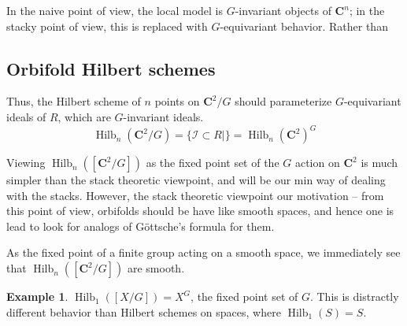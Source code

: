 \documentclass{amsart}[12pt]
\theoremstyle{definition}
\newtheorem{example}[dummy]{Example}
\newcommand{\C}{\mathbf{C}}
\DeclareMathOperator{\Hilb}{Hilb}
\begin{document}
In the naive point of view, the local model is $G$-invariant objects of $\C^n$; in the stacky point of view, this is replaced with $G$-equivariant behavior.  Rather than 



\subsection{Orbifold Hilbert schemes}




Thus, the Hilbert scheme of $n$ points on $\C^2/G$ should parameterize $G$-equivariant ideals of $R$, which are $G$-invariant ideals.  
$$\Hilb_n(\C^2/G)=\{\mathcal{I}\subset R | \} =\Hilb_n(\C^2)^G$$

Viewing $\Hilb_n([\C^2/G])$ as the fixed point set of the $G$ action on $\C^2$ is much simpler than the stack theoretic viewpoint, and will be our min way of dealing with the stacks.  However, the stack theoretic viewpoint our motivation -- from this point of view, orbifolds should be have like smooth spaces, and hence one is lead to look for analogs of G\"ottsche's formula for them.


As the fixed point of a finite group acting on a smooth space, we immediately see that $\Hilb_n([\C^2/G])$ are smooth.



\begin{example}
$\Hilb_1([X/G])=X^G$, the fixed point set of $G$.  This is distractly different behavior than Hilbert schemes on spaces, where $\Hilb_1(S)=S$.
\end{example}
\end{document}
